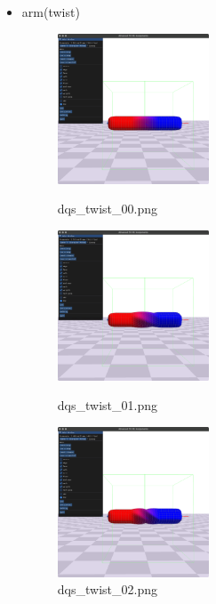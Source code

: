 \documentclass[a4paper,10pt,uplatex,dvipdfmx]{jsarticle}
\begin{document}
\begin{itemize}
  \item arm(twist)
  \begin{figure}[H]
    \begin{minipage}{0.33\hsize}
      \begin{center}
        \includegraphics[width=45mm]{img/dqs_twist_00.png}
        \caption{dqs\_twist\_00.png}
      \end{center}
    \end{minipage}
    \begin{minipage}{0.33\hsize}
      \begin{center}
        \includegraphics[width=45mm]{img/dqs_twist_01.png}
        \caption{dqs\_twist\_01.png}
      \end{center}
    \end{minipage}
    \begin{minipage}{0.33\hsize}
      \begin{center}
        \includegraphics[width=45mm]{img/dqs_twist_02.png}
        \caption{dqs\_twist\_02.png}
      \end{center}
    \end{minipage}
  \end{figure}


\end{itemize}
\end{document}
